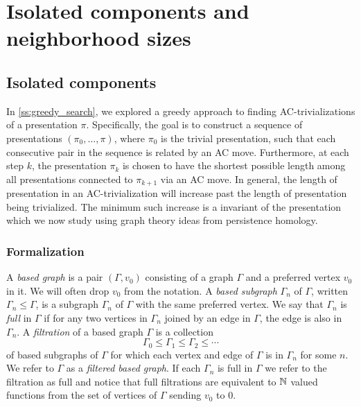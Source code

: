 
\section{Isolated components and neighborhood sizes}\label{sec:isolated}

\subsection{Isolated components}

In \autoref{ss:greedy_search}, we explored a greedy approach to finding AC-trivializations of a presentation \(\pi\). Specifically, the goal is to construct a sequence of presentations \((\pi_0, \dots, \pi)\), where \(\pi_0\) is the trivial presentation, such that each consecutive pair in the sequence is related by an AC move. Furthermore, at each step \(k\), the presentation \(\pi_k\) is chosen to have the shortest possible length among all presentations connected to \(\pi_{k+1}\) via an AC move.
In general, the length of presentation in an AC-trivialization will increase past the length of presentation being trivialized.
The minimum such increase is a invariant of the presentation which we now study using graph theory ideas from persistence homology.


\subsubsection{Formalization}

A \textit{based graph} is a pair $(\Gamma, v_0)$ consisting of a graph $\Gamma$ and a preferred vertex $v_0$ in it.
We will often drop $v_0$ from the notation.
A \textit{based subgraph} $\Gamma_n$ of $\Gamma$, written $\Gamma_n \leq \Gamma$, is a subgraph $\Gamma_n$ of $\Gamma$ with the same preferred vertex.
We say that $\Gamma_n$ is \textit{full} in $\Gamma$ if for any two vertices in $\Gamma_n$ joined by an edge in $\Gamma$, the edge is also in $\Gamma_n$.
A \textit{filtration} of a based graph $\Gamma$ is a collection
\[
\Gamma_0 \leq \Gamma_1 \leq \Gamma_2 \leq \dotsb
\]
of based subgraphs of $\Gamma$ for which each vertex and edge of $\Gamma$ is in $\Gamma_n$ for some $n$.
We refer to $\Gamma$ as a \textit{filtered based graph}.
If each $\Gamma_n$ is full in $\Gamma$ we refer to the filtration as full and notice that full filtrations are equivalent to $\mathbb{N}$ valued functions from the set of vertices of $\Gamma$ sending $v_0$ to $0$.

